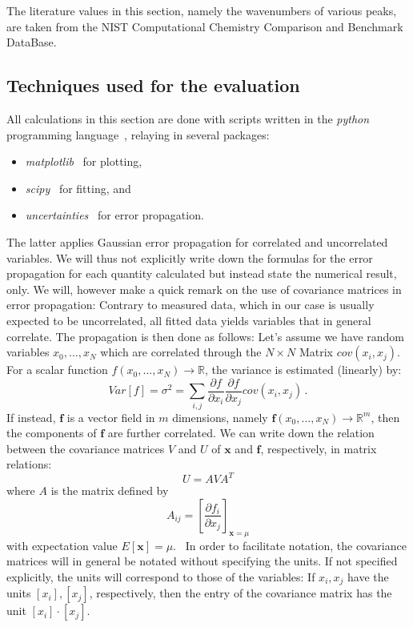 The literature values in this section, namely the wavenumbers of various peaks, are taken from the NIST 
Computational Chemistry Comparison and Benchmark DataBase\cite{nist}.
\subsection{Techniques used for the evaluation}
All calculations in this section are done with scripts written in 
the \textit{python} programming language~\cite{python}, relaying in several 
packages:
\begin{itemize}
    \item
        \textit{matplotlib}~\cite{Hunter2007} for plotting,
    \item
        \textit{scipy}~\cite{scipy} for fitting, and 
    \item
        \textit{uncertainties}~\cite{uc} for error propagation.
\end{itemize}
The latter applies Gaussian error propagation for correlated and uncorrelated variables. 
We will thus not explicitly write down the formulas for the error propagation 
for each quantity calculated but instead state the numerical result, only. 
We will, however make a quick remark on the use of covariance matrices in 
error propagation: Contrary to measured data, which in our case is usually 
expected to be uncorrelated, all fitted data yields variables that in general correlate. 
The propagation is then done as follows:
Let's assume we have random
variables $x_0,...,x_N$ which are correlated through the $N\times N$ Matrix $cov(x_i,x_j)$.
For a scalar function $f(x_0,...,x_N) \rightarrow \mathbb{R}$, the variance is estimated (linearly) by:
\begin{equation}
Var[f] = \sigma^2 = \sum_{i,j} \frac{\partial f}{\partial x_i} \frac{\partial f}{\partial x_j} cov(x_i,x_j) \,.
\end{equation} 
If instead, $\mathbf{f}$ is a vector field in $m$ dimensions, namely 
$\mathbf{f}(x_0,...,x_N) \rightarrow \mathbb{R}^m$, then the components of $\mathbf{f}$ 
are further correlated. We can write down the relation between the covariance matrices $V$ and $U$ of 
$\mathbf{x}$ and $\mathbf{f}$, respectively, in matrix relations:
\begin{equation}
    U = A V A^T
\end{equation}
where $A$ is the matrix defined by 
\begin{equation}
    A_{ij} = \left[ \frac{\partial f_i}{\partial x_j}\right]_{\mathbf{x} = \mu}
\end{equation}
with expectation value $E[\mathbf{x}] = \mu$.~\cite{cowan1998statistical}
In order to facilitate notation, the covariance matrices will in general be notated without 
specifying the units. If not specified explicitly, the units will correspond to those of the
variables: If $x_i, x_j$ have the units $[x_i], [x_j]$, respectively, 
then the entry of the covariance matrix has the unit $[x_i] \cdot [x_j]$. \\
